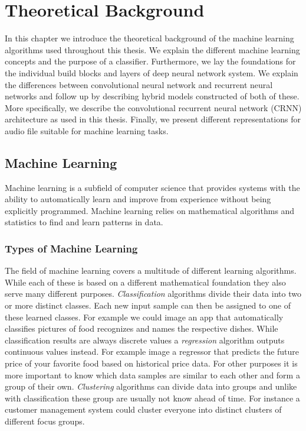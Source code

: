 \section{Theoretical Background}
\label{sec:theoretical_background}
In this chapter we introduce the theoretical background of the machine learning algorithms used throughout this thesis. We explain the different machine learning concepts and the purpose of a classifier. Furthermore, we lay the foundations for the individual build blocks and layers of deep neural network system. We explain the differences between convolutional neural network and recurrent neural networks and follow up by describing hybrid models constructed of both of these. More specifically, we describe the convolutional recurrent neural network (CRNN) architecture as used in this thesis. Finally, we present different representations for audio file suitable for machine learning tasks.

\subsection{Machine Learning}
Machine learning is a subfield of computer science that provides systems with the ability to automatically learn and improve from experience without being explicitly programmed. Machine learning relies on mathematical algorithms and statistics to find and learn patterns in data. 

\subsubsection{Types of Machine Learning}
The field of machine learning covers a multitude of different learning algorithms. While each of these is based on a different mathematical foundation they also serve many different purposes. \textit{Classification} algorithms divide their data into two or more distinct classes. Each new input sample can then be assigned to one of these learned classes. For example we could image an app that automatically classifies pictures of food recognizes and names the respective dishes. While classification results are always discrete values a \textit{regression} algorithm outputs continuous values instead. For example image a regressor that predicts the future price of your favorite food based on historical price data. For other purposes it is more important to know which data samples are similar to each other and form a group of their own. \textit{Clustering} algorithms can divide data into groups and unlike with classification these group are usually not know ahead of time. For instance a customer management system could cluster everyone into distinct clusters of different focus groups.

